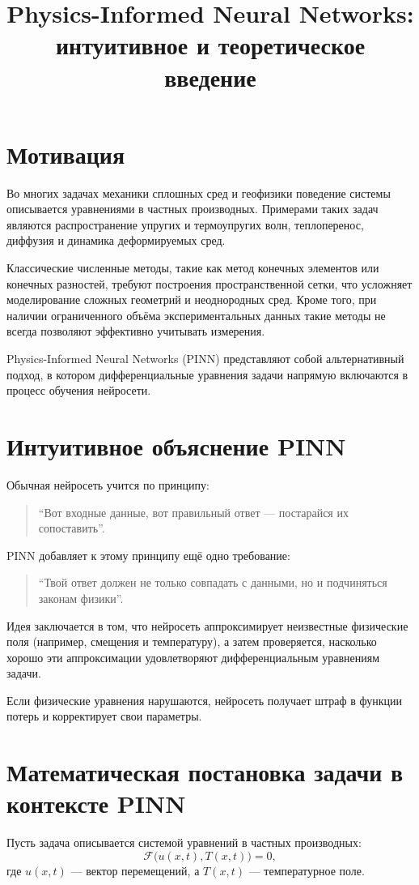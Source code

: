 \documentclass[12pt]{article}
\title{Physics-Informed Neural Networks:\\
интуитивное и теоретическое введение}
\author{}
\date{}
\begin{document}
\section{Мотивация}

Во многих задачах механики сплошных сред и геофизики поведение системы описывается уравнениями в частных производных. Примерами таких задач являются распространение упругих и термоупругих волн, теплоперенос, диффузия и динамика деформируемых сред.

Классические численные методы, такие как метод конечных элементов или конечных разностей, требуют построения пространственной сетки, что усложняет моделирование сложных геометрий и неоднородных сред. Кроме того, при наличии ограниченного объёма экспериментальных данных такие методы не всегда позволяют эффективно учитывать измерения.

Physics-Informed Neural Networks (PINN) представляют собой альтернативный подход, в котором дифференциальные уравнения задачи напрямую включаются в процесс обучения нейросети.


\section{Интуитивное объяснение PINN}

Обычная нейросеть учится по принципу:
\begin{quote}
``Вот входные данные, вот правильный ответ — постарайся их сопоставить''.
\end{quote}

PINN добавляет к этому принципу ещё одно требование:
\begin{quote}
``Твой ответ должен не только совпадать с данными, но и подчиняться законам физики''.
\end{quote}

Идея заключается в том, что нейросеть аппроксимирует неизвестные физические поля (например, смещения и температуру), а затем проверяется, насколько хорошо эти аппроксимации удовлетворяют дифференциальным уравнениям задачи.

Если физические уравнения нарушаются, нейросеть получает штраф в функции потерь и корректирует свои параметры.


\section{Математическая постановка задачи в контексте PINN}

Пусть задача описывается системой уравнений в частных производных:
\begin{equation}
\mathcal{F}\bigl(u(x,t), T(x,t)\bigr) = 0,
\end{equation}
где $u(x,t)$ — вектор перемещений, а $T(x,t)$ — температурное поле.
\end{document}
